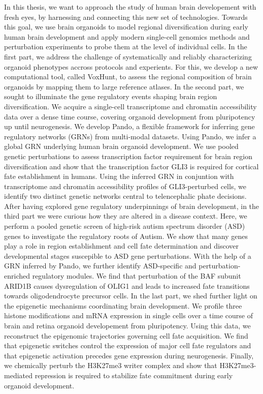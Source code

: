 In this thesis, we want to approach the study of human brain developement with fresh eyes, by harnessing and connecting this new set of technologies. Towards this goal, we use brain organoids to model regional diversification during early human brain development and apply modern single-cell genomics methods and perturbation experiments to probe them at the level of individual cells. In the first part, we address the challenge of systematically and reliably characterizing organoid phenotypes accross protocols and experients. For this, we develop a new computational tool, called VoxHunt, to assess the regional composition of brain organoids by mapping them to large reference atlases. In the second part, we sought to illuminate the gene regulatory events shaping brain region diversification. We acquire a single-cell transcriptome and chromatin accessibility data over a dense time course, covering organoid development from pluripotency up until neurogenesis. We develop Pando, a flexible framework for inferring gene regulatory networks (GRNs) from multi-modal datasets. Using Pando, we infer a global GRN underlying human brain organoid development. We use pooled genetic perturbations to assess transcription factor requirement for brain region diversification and show that the transcription factor GLI3 is required for cortical fate establishment in humans. Using the inferred GRN in conjuntion with transcriptome and chromatin accessibility profiles of GLI3-perturbed cells, we identify two distinct genetic networks central to telencephalic phate decisions. After having explored gene regulatory underpinnings of brain development, in the third part we were curious how they are altered in a disease context. Here, we perform a pooled genetic screen of high-risk autism spectrum disorder (ASD) genes to investigate the regulatory roots of Autism. We show that many genes play a role in region establishment and cell fate determination and discover developmental stages suscepible to ASD gene perturbations. With the help of a GRN inferred by Pando, we further identify ASD-specific and perturbation-enriched regulatory modules. We find that perturbation of the BAF subunit ARID1B causes dysregulation of OLIG1 and leads to increased fate transitions towards oligodendrocyte precursor cells. In the last part, we shed further light on the epigenetic mechanisms coordinating brain development. We profile three histone modifications and mRNA expression in single cells over a time course of brain and retina organoid developement from pluripotency. Using this data, we reconstruct the epigenomic trajectories governing cell fate acquisition. We find that epigenetic switches control the expression of major cell fate regulators and that epigenetic activation precedes gene expression during neurogenesis. Finally, we chemically perturb the H3K27me3 writer complex and show that H3K27me3-mediated repression is required to stabilize fate commitment during early organoid development. 

